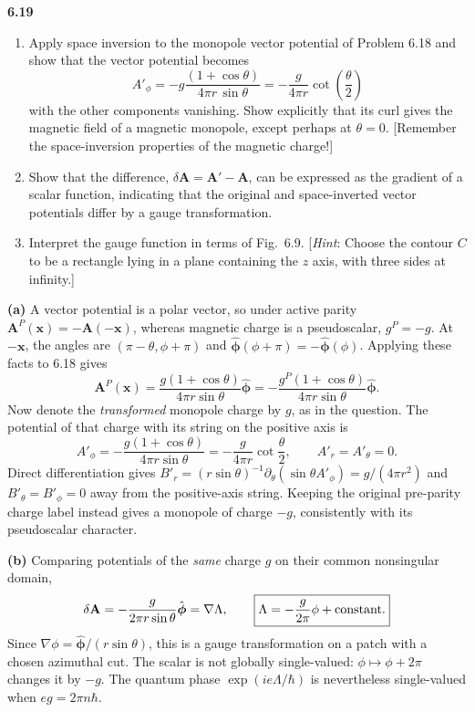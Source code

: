 \par\bigskip
\noindent\textbf{6.19}\quad\begin{enumerate}
\item[(a)] Apply space inversion to the monopole vector potential of Problem 6.18 and show that the vector potential becomes
\[
A'_{\phi}=-g\frac{(1+\cos\theta)}{4\pi r\,\sin\theta}=-\frac{g}{4\pi r}\cot\!\left(\frac{\theta}{2}\right)
\]
with the other components vanishing. Show explicitly that its curl gives the magnetic field of a magnetic monopole, except perhaps at $\theta=0$. [Remember the space-inversion properties of the magnetic charge!]
\item[(b)] Show that the difference, $\delta\mathbf{A}=\mathbf{A}'-\mathbf{A}$, can be expressed as the gradient of a scalar function, indicating that the original and space-inverted vector potentials differ by a gauge transformation.
\item[(c)] Interpret the gauge function in terms of Fig.~6.9. [\emph{Hint}: Choose the contour $C$ to be a rectangle lying in a plane containing the $z$ axis, with three sides at infinity.]
\end{enumerate}
\solution

\textbf{(a)} A vector potential is a polar vector, so under active parity
$\mathbf A^P(\mathbf x)=-\mathbf A(-\mathbf x)$, whereas magnetic charge
is a pseudoscalar, $g^P=-g$. At $-\mathbf x$, the angles are
$(\pi-\theta,\phi+\pi)$ and $\hat{\boldsymbol\phi}(\phi+\pi)
=-\hat{\boldsymbol\phi}(\phi)$. Applying these facts to 6.18 gives
\[
\mathbf A^P(\mathbf x)=\frac{g(1+\cos\theta)}{4\pi r\sin\theta}
\hat{\boldsymbol\phi}
=-\frac{g^P(1+\cos\theta)}{4\pi r\sin\theta}\hat{\boldsymbol\phi}.
\]
Now denote the \emph{transformed} monopole charge by $g$, as in the question.
The potential of that charge with its string on the positive axis is
\[
\boxed{A'_\phi=-\frac{g(1+\cos\theta)}{4\pi r\sin\theta}
=-\frac g{4\pi r}\cot\frac\theta2,\qquad A'_r=A'_\theta=0.}
\]
Direct differentiation gives
$B'_r=(r\sin\theta)^{-1}\partial_\theta(\sin\theta A'_\phi)
=g/(4\pi r^2)$ and $B'_\theta=B'_\phi=0$ away from the positive-axis
string. Keeping the original pre-parity charge label instead gives a
monopole of charge $-g$, consistently with its pseudoscalar character.

\textbf{(b)} Comparing potentials of the \emph{same} charge $g$ on their
common nonsingular domain,
\[
\delta\mathbf A=-\frac g{2\pi r\sin\theta}\hat{\boldsymbol\phi}
=\nabla\Lambda,\qquad
\boxed{\Lambda=-\frac g{2\pi}\phi+\hbox{constant}.}
\]
Since $\nabla\phi=\hat{\boldsymbol\phi}/(r\sin\theta)$, this is a gauge
transformation on a patch with a chosen azimuthal cut. The scalar is not
globally single-valued: $\phi\mapsto\phi+2\pi$ changes it by $-g$.
The quantum phase $\exp(i e\Lambda/\hbar)$ is nevertheless single-valued
when $eg=2\pi n\hbar$.

